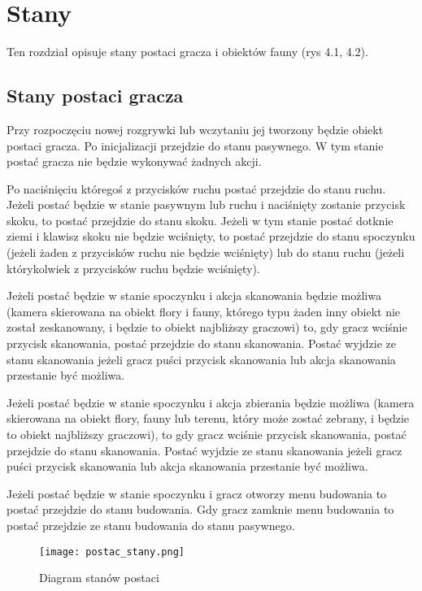 \chapter{Stany}

Ten rozdział opisuje stany postaci gracza i obiektów fauny (rys 4.1, 4.2).

\section{Stany postaci gracza}

Przy rozpoczęciu nowej rozgrywki lub wczytaniu jej tworzony będzie obiekt postaci gracza. Po inicjalizacji przejdzie do stanu pasywnego. W tym stanie postać gracza nie będzie wykonywać żadnych akcji. 

Po naciśnięciu któregoś z przycisków ruchu postać przejdzie do stanu ruchu. Jeżeli postać będzie w stanie pasywnym lub ruchu i naciśnięty zostanie przycisk skoku, to postać przejdzie do stanu skoku. Jeżeli w tym stanie postać dotknie ziemi i klawisz skoku nie będzie wciśnięty, to postać przejdzie do stanu spoczynku (jeżeli żaden z przycisków ruchu nie będzie wciśnięty) lub do stanu ruchu (jeżeli którykolwiek z przycisków ruchu będzie wciśnięty). 

Jeżeli postać będzie w stanie spoczynku i akcja skanowania będzie możliwa (kamera skierowana na obiekt flory i fauny, którego typu żaden inny obiekt nie został zeskanowany, i będzie to obiekt najbliższy graczowi) to, gdy gracz wciśnie przycisk skanowania, postać przejdzie do stanu skanowania. Postać wyjdzie ze stanu skanowania jeżeli gracz puści przycisk skanowania lub akcja skanowania przestanie być możliwa. 

Jeżeli postać będzie w stanie spoczynku i akcja zbierania będzie możliwa (kamera skierowana na obiekt flory, fauny lub terenu, który może zostać zebrany, i będzie to obiekt najbliższy graczowi), to gdy gracz wciśnie przycisk skanowania, postać przejdzie do stanu skanowania. Postać wyjdzie ze stanu skanowania jeżeli gracz puści przycisk skanowania lub akcja skanowania przestanie być możliwa. 

Jeżeli postać będzie w stanie spoczynku i gracz otworzy menu budowania to postać przejdzie do stanu budowania. Gdy gracz zamknie menu budowania to postać przejdzie ze stanu budowania do stanu pasywnego.

\begin{figure}[H]
    \centering
        \texttt{[image: postac\_stany.png]}
        \caption{Diagram stanów postaci}
\end{figure}

